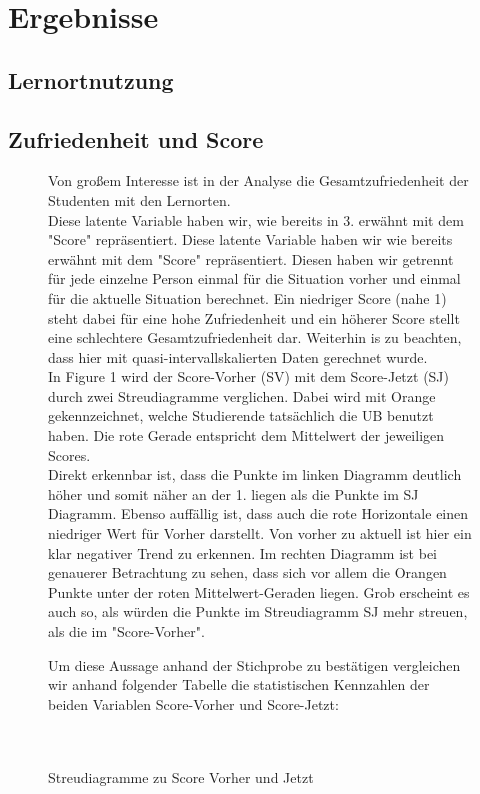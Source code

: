 \documentclass[11pt, a4paper]{article}
\begin{document}
\newpage
\section{Ergebnisse}
\subsection{Lernortnutzung}
\newpage
\subsection{Zufriedenheit und Score}
\begin{figure}[htb]
Von großem Interesse ist in der Analyse die Gesamtzufriedenheit der Studenten mit den Lernorten.\\ Diese latente Variable haben wir, wie bereits in 3. erwähnt mit dem "Score" repräsentiert. Diese latente Variable haben wir wie bereits erwähnt mit dem "Score" repräsentiert.
Diesen haben wir getrennt für jede einzelne Person einmal für die Situation vorher und einmal für die aktuelle Situation berechnet.
Ein niedriger Score (nahe 1) steht dabei für eine hohe Zufriedenheit und ein höherer Score stellt eine schlechtere Gesamtzufriedenheit dar.
Weiterhin is zu beachten, dass hier mit quasi-intervallskalierten Daten gerechnet wurde. \\
In Figure 1 wird der Score-Vorher (SV) mit dem Score-Jetzt (SJ) durch zwei Streudiagramme verglichen.
Dabei wird mit Orange gekennzeichnet, welche Studierende tatsächlich die UB benutzt haben. Die rote Gerade entspricht dem Mittelwert der jeweiligen Scores. \\
Direkt erkennbar ist, dass die Punkte im linken Diagramm deutlich höher und somit näher an der 1. liegen als die Punkte im SJ Diagramm.
Ebenso auffällig ist, dass auch die rote Horizontale einen niedriger Wert für Vorher darstellt. 
Von vorher zu aktuell ist hier ein klar negativer Trend zu erkennen.
Im rechten Diagramm ist bei genauerer Betrachtung zu sehen, dass sich vor allem die Orangen Punkte unter der roten Mittelwert-Geraden liegen.
Grob erscheint es auch so, als würden die Punkte im Streudiagramm SJ mehr streuen, als die im "Score-Vorher".

{\centering 
\vspace{-2cm}
\caption{Streudiagramme zu Score Vorher und Jetzt}}

\vspace{1cm}
Um diese Aussage anhand der Stichprobe zu bestätigen vergleichen wir anhand folgender Tabelle die statistischen Kennzahlen der beiden Variablen Score-Vorher und Score-Jetzt:\\\\\\
\end{figure}
\end{document}
